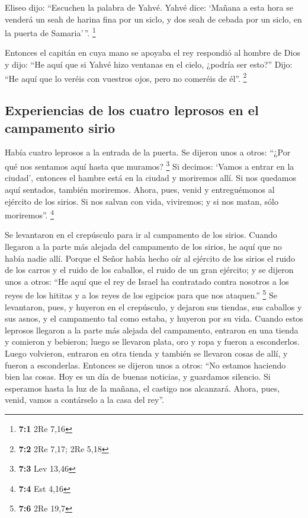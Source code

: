 Eliseo dijo: ``Escuchen la palabra de Yahvé. Yahvé dice:
`Mañana a esta hora se venderá un seah de harina fina por un siclo, y
dos seah de cebada por un siclo, en la puerta de Samaria'\,''.
\footnote{\textbf{7:1} 2Re 7,16}

 Entonces el capitán en cuya mano se apoyaba el rey
respondió al hombre de Dios y dijo: ``He aquí que si Yahvé hizo ventanas
en el cielo, ¿podría ser esto?'' Dijo: ``He aquí que lo veréis con
vuestros ojos, pero no comeréis de él''. \footnote{\textbf{7:2} 2Re
  7,17; 2Re 5,18}

\hypertarget{experiencias-de-los-cuatro-leprosos-en-el-campamento-sirio}{%
\subsection{Experiencias de los cuatro leprosos en el campamento
sirio}\label{experiencias-de-los-cuatro-leprosos-en-el-campamento-sirio}}

 Había cuatro leprosos a la entrada de la puerta. Se
dijeron unos a otros: ``¿Por qué nos sentamos aquí hasta que muramos?
\footnote{\textbf{7:3} Lev 13,46}  Si decimos: `Vamos a
entrar en la ciudad', entonces el hambre está en la ciudad y moriremos
allí. Si nos quedamos aquí sentados, también moriremos. Ahora, pues,
venid y entreguémonos al ejército de los sirios. Si nos salvan con vida,
viviremos; y si nos matan, sólo moriremos''. \footnote{\textbf{7:4} Est
  4,16}

 Se levantaron en el crepúsculo para ir al campamento de
los sirios. Cuando llegaron a la parte más alejada del campamento de los
sirios, he aquí que no había nadie allí.  Porque el Señor
había hecho oír al ejército de los sirios el ruido de los carros y el
ruido de los caballos, el ruido de un gran ejército; y se dijeron unos a
otros: ``He aquí que el rey de Israel ha contratado contra nosotros a
los reyes de los hititas y a los reyes de los egipcios para que nos
ataquen.'' \footnote{\textbf{7:6} 2Re 19,7}  Se
levantaron, pues, y huyeron en el crepúsculo, y dejaron sus tiendas, sus
caballos y sus asnos, y el campamento tal como estaba, y huyeron por su
vida.  Cuando estos leprosos llegaron a la parte más
alejada del campamento, entraron en una tienda y comieron y bebieron;
luego se llevaron plata, oro y ropa y fueron a esconderlos. Luego
volvieron, entraron en otra tienda y también se llevaron cosas de allí,
y fueron a esconderlas.  Entonces se dijeron unos a otros:
``No estamos haciendo bien las cosas. Hoy es un día de buenas noticias,
y guardamos silencio. Si esperamos hasta la luz de la mañana, el castigo
nos alcanzará. Ahora, pues, venid, vamos a contárselo a la casa del
rey''.

